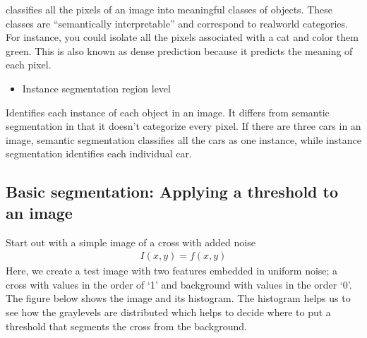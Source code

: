 \documentclass[letterpaper,10pt,english]{sphinxmanual}
\begin{document}
classifies all the pixels of an image into meaningful classes of objects. These classes are “semantically interpretable” and correspond to real\sphinxhyphen{}world categories. For instance, you could isolate all the pixels associated with a cat and color them green. This is also known as dense prediction because it predicts the meaning of each pixel.
\begin{itemize}
\item {} 
Instance segmentation \sphinxhyphen{} region level

\end{itemize}

Identifies each instance of each object in an image. It differs from semantic segmentation in that it doesn’t categorize every pixel. If there are three cars in an image, semantic segmentation classifies all the cars as one instance, while instance segmentation identifies each individual car.


\subsection{Basic segmentation: Applying a threshold to an image}
\label{\detokenize{ML4NeutronImageSegmentation:basic-segmentation-applying-a-threshold-to-an-image}}
Start out with a simple image of a cross with added noise
\begin{equation*}
\begin{split} I(x,y) = f(x,y) \end{split}
\end{equation*}
Here, we create a test image with two features embedded in uniform noise; a cross with values in the order of ‘1’ and background with values in the order ‘0’. The figure below shows the image and its histogram. The histogram helps us to see how the graylevels are distributed which helps to decide where to put a threshold that segments the cross from the background.
\end{document}
